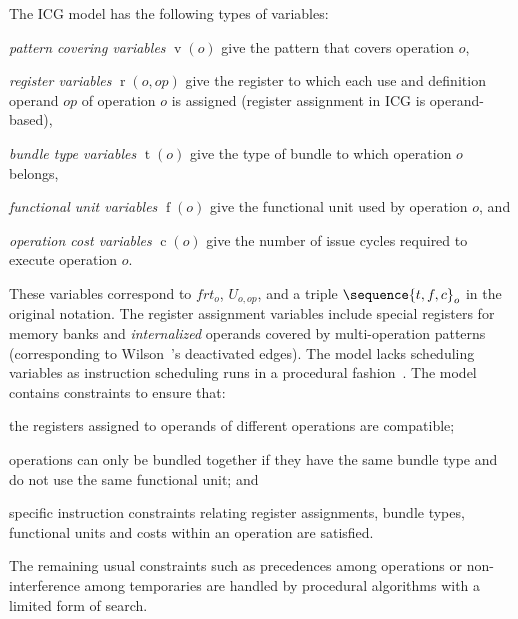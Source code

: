 \documentclass[acmsmall,authorversion,nonacm]{acmart}
\newcommand{\noMathVar}[2]{\operatorname{#1}(#2)}
\newcommand{\var}[2]{$\noMathVar{#1}{#2}$}
\begin{document}
The ICG model has the following types of variables:
\begin{inparaitem}[]
\item \emph{pattern covering variables} \var{v}{o} give the pattern
  that covers operation $o$,
\item \emph{register variables} \var{r}{o, op} give the register to
  which each use and definition operand $op$ of operation $o$ is
  assigned (register assignment in ICG is operand-based),
\item \emph{bundle type variables} \var{t}{o} give the type of
  bundle to which operation $o$ belongs,
\item \emph{functional unit variables} \var{f}{o} give the
  functional unit used by operation $o$, and
\item \emph{operation cost variables} \var{c}{o} give the number of
  issue cycles required to execute operation $o$.
\end{inparaitem}
These variables correspond to $frt_o$, $U_{o, op}$, and a triple
$\sequence{t, f, c}_o$ in the original notation.
The register assignment variables include special registers for memory
banks and \emph{internalized} operands covered by multi-operation
patterns (corresponding to Wilson~\etal{}'s deactivated edges).
The model lacks scheduling variables as instruction scheduling runs
in a procedural fashion~\cite[Section 7]{Bashford1999}.
The model contains constraints to ensure that:
\begin{inparaitem}[]
\item the registers assigned to operands of different operations are
  compatible;
\item operations can only be bundled together if they have the same
  bundle type and do not use the same functional unit; and
\item specific instruction constraints relating register assignments,
  bundle types, functional units and costs within an operation are
  satisfied.
\end{inparaitem}
The remaining usual constraints such as precedences among operations
or non-interference among temporaries are handled by procedural
algorithms with a limited form of search.
\end{document}
